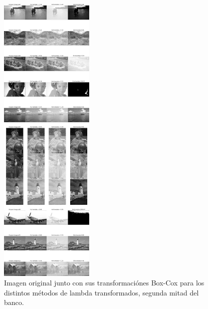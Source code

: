 \begin{figure}
    \centering
    \includegraphics[width=0.4\textwidth]{figuras/img_BCI_all_2.png}
    \caption{Imagen original junto con sus transformaci\'ones Box-Cox para los distintos m\'etodos de lambda transformados, segunda mitad del banco.}
\end{figure}


